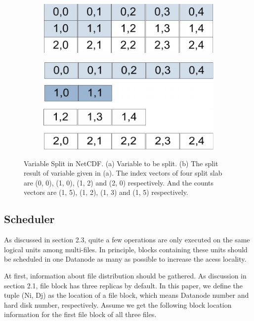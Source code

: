 \documentclass[preprint,12pt]{elsarticle}
\begin{document}
\begin{figure}[htb]
    \centering
    \begin{subfigure}{.5\textwidth}
        \includegraphics[width=\textwidth]{figure4a}
        \caption{}
        \label{figure4a}
    \end{subfigure}

    \begin{subfigure}{\textwidth}
        \centering
        \includegraphics[width=.5\textwidth]{figure4b}%
        \caption{}
        \label{figure4b}
    \end{subfigure}
    \caption{Variable Split in NetCDF. (a) Variable to be split. (b) The split result of variable given in (a). The index vectors of four
            split slab are (0, 0), (1, 0), (1, 2) and (2, 0) respectively. And the counts vectors are (1, 5), (1, 2), (1, 3) and (1, 5) 
            respectively.}
\end{figure}

\subsection{Scheduler}
As discussed in section 2.3, quite a few operations are only executed on the same logical units among multi-files. In principle, blocks 
containing these units should be scheduled in one Datanode as many as possible to increase the acess locality. \par
At first, information about file distribution should be gathered. As discussion in section 2.1, file block has three replicas by default. 
In this paper, we define the tuple (Ni, Dj) as the location of a file block, which means Datanode number and hard disk number, respectively. 
Assume we get the following block location information for the first file block of all three files. \par
\end{document}
